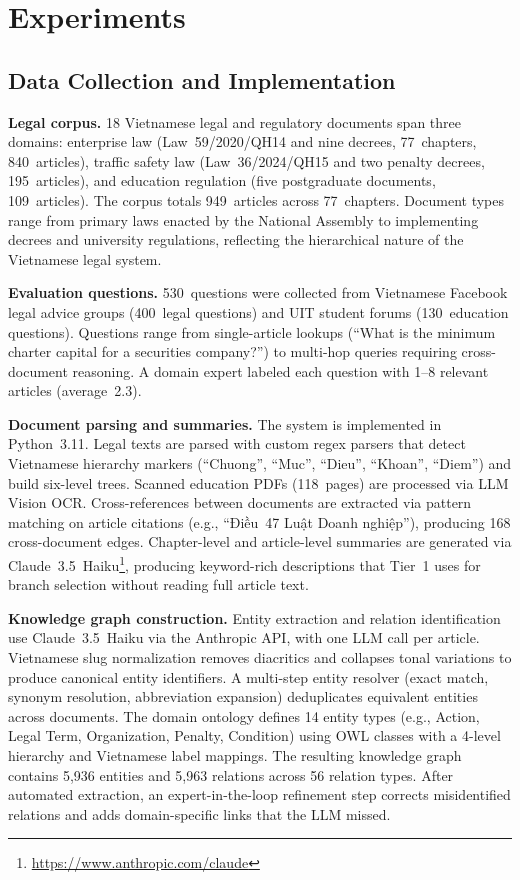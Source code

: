 \documentclass{IOS-Book-Article}
\begin{document}
\section{Experiments}
\label{sec:experiments}

\subsection{Data Collection and Implementation}
\label{sec:implementation}

\textbf{Legal corpus.} 18 Vietnamese legal and regulatory documents span three domains: enterprise law (Law~59/2020/QH14 and nine decrees, 77~chapters, 840~articles), traffic safety law (Law~36/2024/QH15 and two penalty decrees, 195~articles), and education regulation (five postgraduate documents, 109~articles). The corpus totals 949~articles across 77~chapters. Document types range from primary laws enacted by the National Assembly to implementing decrees and university regulations, reflecting the hierarchical nature of the Vietnamese legal system.

\textbf{Evaluation questions.} 530~questions were collected from Vietnamese Facebook legal advice groups (400~legal questions) and UIT student forums (130~education questions). Questions range from single-article lookups (``What is the minimum charter capital for a securities company?'') to multi-hop queries requiring cross-document reasoning. A domain expert labeled each question with 1--8 relevant articles (average~2.3).

\textbf{Document parsing and summaries.} The system is implemented in Python~3.11. Legal texts are parsed with custom regex parsers that detect Vietnamese hierarchy markers (``Chuong'', ``Muc'', ``Dieu'', ``Khoan'', ``Diem'') and build six-level trees. Scanned education PDFs (118~pages) are processed via LLM Vision OCR. Cross-references between documents are extracted via pattern matching on article citations (e.g., ``Điều~47 Luật Doanh nghiệp''), producing 168 cross-document edges. Chapter-level and article-level summaries are generated via Claude~3.5~Haiku\footnote{\url{https://www.anthropic.com/claude}}, producing keyword-rich descriptions that Tier~1 uses for branch selection without reading full article text.

\textbf{Knowledge graph construction.} Entity extraction and relation identification use Claude~3.5~Haiku via the Anthropic API, with one LLM call per article. Vietnamese slug normalization removes diacritics and collapses tonal variations to produce canonical entity identifiers. A multi-step entity resolver (exact match, synonym resolution, abbreviation expansion) deduplicates equivalent entities across documents. The domain ontology defines 14 entity types (e.g., Action, Legal Term, Organization, Penalty, Condition) using OWL classes with a 4-level hierarchy and Vietnamese label mappings. The resulting knowledge graph contains 5,936 entities and 5,963 relations across 56 relation types. After automated extraction, an expert-in-the-loop refinement step corrects misidentified relations and adds domain-specific links that the LLM missed.
\end{document}
